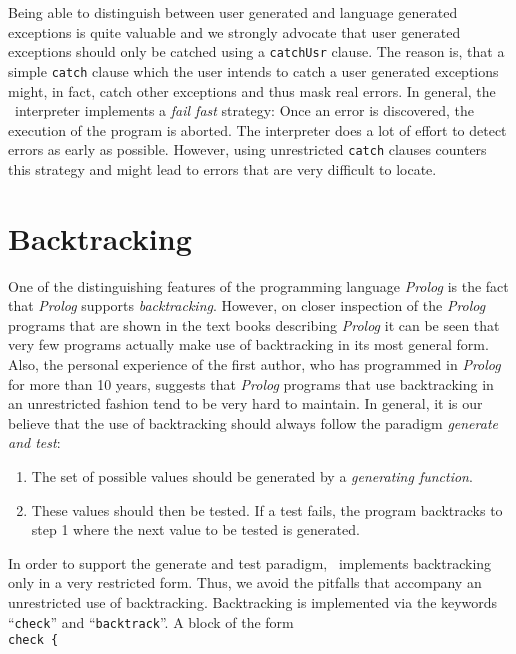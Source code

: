 Being able to distinguish between user generated  and language generated exceptions is
quite valuable and we strongly advocate that user generated exceptions should only be
catched using a \texttt{catchUsr} clause.  The reason is, that a simple
\texttt{catch} clause which the user intends to catch a user generated exceptions might,
in fact, catch 
other exceptions and thus mask real errors.  In general, the \setlx\ interpreter
implements a \emph{fail fast} strategy:  Once an error is discovered, the execution of the
program is aborted.  The interpreter does a lot of effort to detect errors as early as
possible.  However, using unrestricted \texttt{catch} clauses counters this strategy and
might lead to errors that are very difficult to locate.

\section{Backtracking}
One of the distinguishing features of the programming language \textsl{Prolog} is the fact
that \textsl{Prolog} supports \emph{backtracking}.  However, on closer inspection of the
\textsl{Prolog} programs that are shown in the text books describing \textsl{Prolog}
\cite{sterling86, bratko:90} it can be seen that very few programs actually make use of
backtracking in its most general form.  Also, the personal experience of the first author, who
has programmed in \textsl{Prolog} for more than 10 years, suggests that \textsl{Prolog}
programs that use backtracking in an unrestricted fashion tend to be very hard to maintain.  
In general, it is our believe that the use of backtracking should always follow the
paradigm \emph{generate and test}:
\begin{enumerate}
\item The set of possible values should be generated by a \emph{generating function}.  
\item These values should then be tested.  If a test fails, the program backtracks
      to step 1 where the next value to be tested is generated.
\end{enumerate}
In order to support the generate and test paradigm,  \setlx\ 
implements backtracking only in a very restricted form.  Thus, we avoid the
pitfalls that accompany an unrestricted use of backtracking.
Backtracking is implemented  via the keywords ``\texttt{check}'' and
``\texttt{backtrack}''.  A block of the form
\\[0.2cm]
\hspace*{1.3cm}
\texttt{check \{} 
\\
